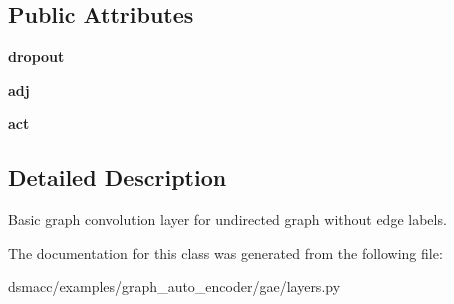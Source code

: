 \subsection*{Public Attributes}
\begin{DoxyCompactItemize}
\item 
\mbox{\label{classdsmacc_1_1examples_1_1graph__auto__encoder_1_1gae_1_1layers_1_1GraphConvolution_ac53996a92fb6f3647a8a6a2ee5416b1d}} 
{\bfseries dropout}
\item 
\mbox{\label{classdsmacc_1_1examples_1_1graph__auto__encoder_1_1gae_1_1layers_1_1GraphConvolution_ac36eccedaf978fe10b1b94565f7a830a}} 
{\bfseries adj}
\item 
\mbox{\label{classdsmacc_1_1examples_1_1graph__auto__encoder_1_1gae_1_1layers_1_1GraphConvolution_abd0f624e1749e8baec54e121629e28b8}} 
{\bfseries act}
\end{DoxyCompactItemize}


\subsection{Detailed Description}
\begin{DoxyVerb}Basic graph convolution layer for undirected graph without edge labels.\end{DoxyVerb}
 

The documentation for this class was generated from the following file\+:\begin{DoxyCompactItemize}
\item 
dsmacc/examples/graph\+\_\+auto\+\_\+encoder/gae/layers.\+py\end{DoxyCompactItemize}
